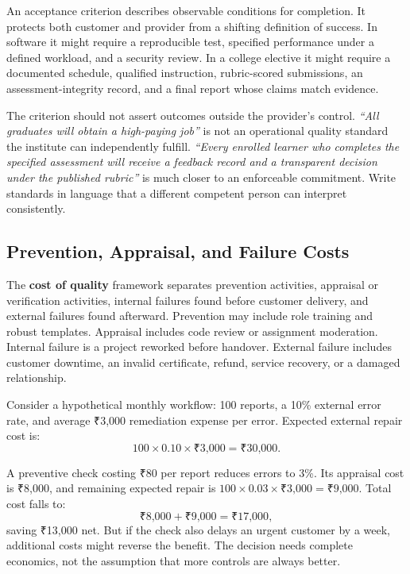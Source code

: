 An acceptance criterion describes observable conditions for completion. It protects both customer and provider from a shifting definition of success. In software it might require a reproducible test, specified performance under a defined workload, and a security review. In a college elective it might require a documented schedule, qualified instruction, rubric-scored submissions, an assessment-integrity record, and a final report whose claims match evidence.

The criterion should not assert outcomes outside the provider's control. \textit{``All graduates will obtain a high-paying job''} is not an operational quality standard the institute can independently fulfill. \textit{``Every enrolled learner who completes the specified assessment will receive a feedback record and a transparent decision under the published rubric''} is much closer to an enforceable commitment. Write standards in language that a different competent person can interpret consistently.

\subsection{Prevention, Appraisal, and Failure Costs}
\label{sec:cost_of_quality}

The \textbf{cost of quality} framework separates prevention activities, appraisal or verification activities, internal failures found before customer delivery, and external failures found afterward. Prevention may include role training and robust templates. Appraisal includes code review or assignment moderation. Internal failure is a project reworked before handover. External failure includes customer downtime, an invalid certificate, refund, service recovery, or a damaged relationship.

Consider a hypothetical monthly workflow: 100 reports, a 10\% external error rate, and average ₹3,000 remediation expense per error. Expected external repair cost is:
\begin{equation}
100 \times 0.10 \times \text{₹3,000} = \text{₹30,000}.
\end{equation}

A preventive check costing ₹80 per report reduces errors to 3\%. Its appraisal cost is ₹8,000, and remaining expected repair is $100 \times 0.03 \times \text{₹3,000} = \text{₹9,000}$. Total cost falls to:
\begin{equation}
\text{₹8,000} + \text{₹9,000} = \text{₹17,000},
\end{equation}
saving ₹13,000 net. But if the check also delays an urgent customer by a week, additional costs might reverse the benefit. The decision needs complete economics, not the assumption that more controls are always better.

